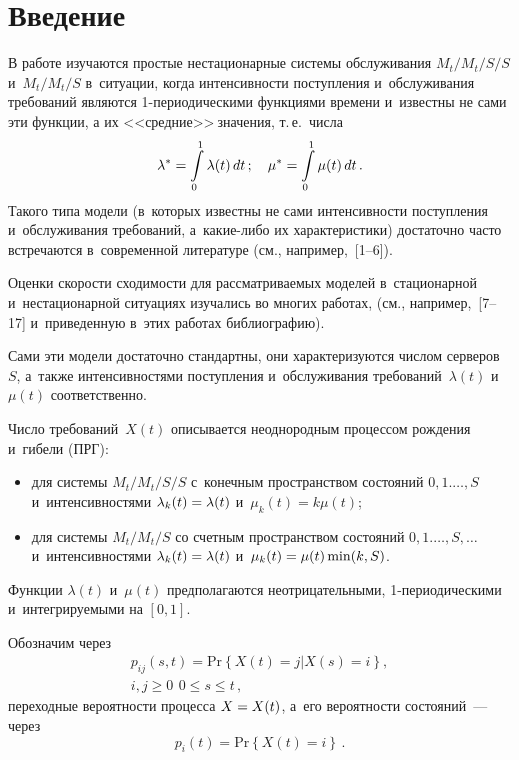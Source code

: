 \thispagestyle{headings}

\begin{multicols}{2}

\label{st\stat}

\section{Введение}


В работе изучаются простые нестационарные системы обслуживания
$M_t/M_t/S/S$ и~$M_t/M_t/S$ в~ситуации, когда интенсивности
поступления и~обслуживания требований являются 1-пе\-рио\-ди\-че\-ски\-ми
функциями времени и~известны не сами эти функции, а их
<<средние>>$~$значения, т.\,е.\ числа 
$$
\la^*=\int\limits_0^1\la (t)\, dt\,;\quad
\mu^*\hm=\int\limits_0^1\mu (t)\, dt\,.
$$
 Такого типа модели (в~которых известны
не сами интенсивности поступления и~обслуживания требований, 
а~ка\-кие-ли\-бо их характеристики) достаточно часто встречаются 
в~современной литературе (см., например,~[1--6]).

Оценки скорости сходимости для рассматриваемых моделей 
в~стационарной и~нестационарной ситуациях изучались во многих работах,
(см., например,~[7--17] и~приведенную в~этих работах биб\-лио\-гра\-фию).

Сами эти модели достаточно стандартны, они характеризуются числом
серверов~$S$, а~также интенсивностями поступления и~обслуживания
требований~$\lambda(t)$ и~$\mu(t)$ соответственно.

Число требований~$X(t)$ описывается неоднородным процессом
рождения и~гибели (ПРГ):
\begin{itemize}
\item для системы $M_t/M_t/S/S$ с~конечным пространством состояний $0,1.
\dots, S$ и~интенсивностями $\lambda_k(t) \hm= \lambda(t)$ и~$\mu_k(t)=k\mu(t)$;

\item  для системы $M_t/M_t/S$ со счетным  пространством состояний $0,1.
\dots, S, \dots $ и~интенсивностями $\lambda_k(t) \hm= \lambda(t)$ 
и~$\mu_k(t)\hm=\mu(t)\min(k,S)$.
\end{itemize}

Функции $\lambda(t)$ и~$\mu(t)$ предполагаются неотрицательными,
1-пе\-рио\-ди\-че\-ски\-ми и~интегрируемыми на $[0,1]$.

Обозначим через 
\begin{multline*}
p_{ij}(s,t)=\mathrm{Pr}\left\{ X(t)=j\left| X(s)=i\right.
\right\},\\ i,j \ge 0\,\ 0\leq s\leq t\,,
\end{multline*}
 переходные вероятности
процесса $X\hm=X(t)$, а~его вероятности состояний~--- через  
$$
p_i(t)=\mathrm{Pr}\left\{ X(t)=i \right\}\,.
$$



\end{multicols}

